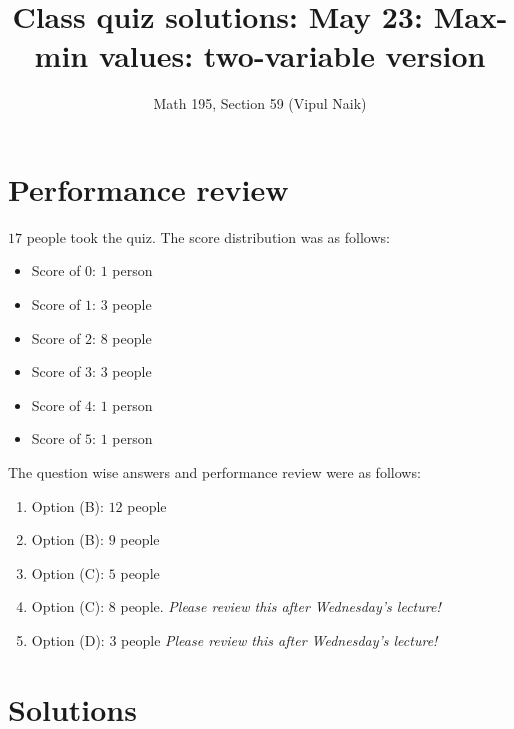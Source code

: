 \documentclass[10pt]{amsart}
\title{Class quiz solutions: May 23: Max-min values: two-variable version}
\author{Math 195, Section 59 (Vipul Naik)}
\begin{document}
\maketitle

\section{Performance review}

$17$ people took the quiz. The score distribution was as follows:

\begin{itemize}
\item Score of $0$: $1$ person
\item Score of $1$: $3$ people
\item Score of $2$: $8$ people
\item Score of $3$: $3$ people
\item Score of $4$: $1$ person
\item Score of $5$: $1$ person
\end{itemize}

The question wise answers and performance review were as follows:

\begin{enumerate}
\item Option (B): $12$ people
\item Option (B): $9$ people
\item Option (C): $5$ people
\item Option (C): $8$ people. {\em Please review this after Wednesday's lecture!}
\item Option (D): $3$ people {\em Please review this after Wednesday's lecture!}
\end{enumerate}

\section{Solutions}
\end{document}
